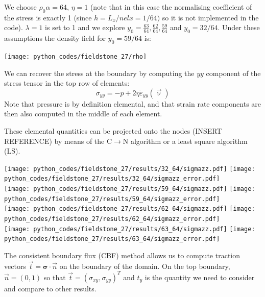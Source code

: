 We choose $\rho_0 \alpha = 64$, $\eta=1$ (note that in this case the 
normalising coefficient of the stress is exactly 1 (since $h=L_x/nelx=1/64)$ so it is not implemented in the code).
$\lambda=1$ is set to 1 and we explore $y_0 = \frac{63}{64},\frac{62}{64},\frac{59}{64}$ and $y_0=32/64$.
Under these assumptions the density field for $y_0=59/64$ is:
\begin{center}
\texttt{[image: python\_codes/fieldstone\_27/rho]}
\end{center}

We can recover the stress at the boundary by computing 
the $yy$ component of the stress tensor in the top row of elements: 
\[
\sigma_{yy} = -p + 2 \eta \dot{\varepsilon}_{yy}(\vec\upnu)
\]
Note that pressure is by definition elemental, and that strain rate
components are then also computed in the middle of each element.

These elemental quantities can be projected onto the nodes (INSERT REFERENCE)
by means of the C$\rightarrow$N algorithm or a least square algorithm (LS). 

\begin{center}
\texttt{[image: python\_codes/fieldstone\_27/results/32\_64/sigmazz.pdf]}
\texttt{[image: python\_codes/fieldstone\_27/results/32\_64/sigmazz\_error.pdf]}\\
\texttt{[image: python\_codes/fieldstone\_27/results/59\_64/sigmazz.pdf]}
\texttt{[image: python\_codes/fieldstone\_27/results/59\_64/sigmazz\_error.pdf]}\\
\texttt{[image: python\_codes/fieldstone\_27/results/62\_64/sigmazz.pdf]}
\texttt{[image: python\_codes/fieldstone\_27/results/62\_64/sigmazz\_error.pdf]}\\
\texttt{[image: python\_codes/fieldstone\_27/results/63\_64/sigmazz.pdf]}
\texttt{[image: python\_codes/fieldstone\_27/results/63\_64/sigmazz\_error.pdf]}
\end{center}

The consistent boundary flux (CBF) method allows us to compute traction vectors $\vec{t}={\bm \sigma}\cdot\vec{n}$
on the boundary of the domain. On the top boundary, $\vec{n}=(0,1)$ so that $\vec{t}=(\sigma_{xy}, \sigma_{yy})^T$ and 
$t_y$ is the quantity we need to consider and compare to other results.

